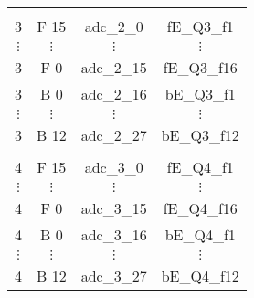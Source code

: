 \begin{tabular}{cccc}
          &                            		   				   &               &               \\
3         &  F 15             				   				   &  adc\_2\_0    &  fE\_Q3\_f1   \\
$\vdots$  &  $\vdots$                  		   				   &  $\vdots$     &  $\vdots$     \\
3         &  F 0              				   				   &  adc\_2\_15   &  fE\_Q3\_f16  \\
3         &  B 0              				   				   &  adc\_2\_16   &  bE\_Q3\_f1   \\
$\vdots$  &  $\vdots$                  		   				   &  $\vdots$     &  $\vdots$     \\
3         &  B 12             				   				   &  adc\_2\_27   &  bE\_Q3\_f12  \\
          &                            		   				   &               &               \\
4         &  F 15             				   				   &  adc\_3\_0    &  fE\_Q4\_f1   \\
$\vdots$  &  $\vdots$                  		   				   &  $\vdots$     &  $\vdots$     \\
4         &  F 0              				   				   &  adc\_3\_15   &  fE\_Q4\_f16  \\
4         &  B 0              				   				   &  adc\_3\_16   &  bE\_Q4\_f1   \\
$\vdots$  &  $\vdots$                  		   				   &  $\vdots$     &  $\vdots$     \\
4         &  B 12             	 			   				   &  adc\_3\_27   &  bE\_Q4\_f12  \\
\hline
\end{tabular}